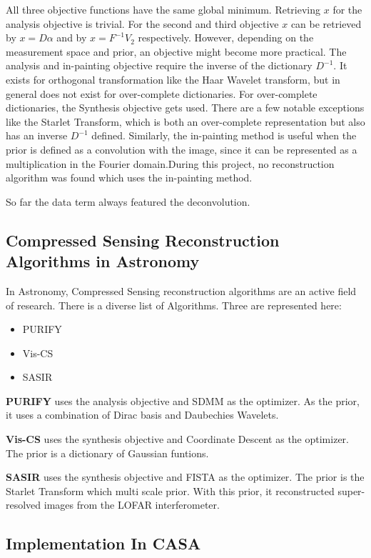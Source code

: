 All three objective functions have the same global minimum. Retrieving $x$ for the analysis objective is trivial. For the second and third objective $x$ can be retrieved by $x = D\alpha$ and by $x = F^{-1}V_2$ respectively. However, depending on the measurement space and prior, an objective might become more practical. The analysis and in-painting objective require the inverse of the dictionary $D^{-1}$. It exists for orthogonal transformation like the Haar Wavelet transform, but in general does not exist for over-complete dictionaries. For over-complete dictionaries, the Synthesis objective gets used. There are a few notable exceptions like the Starlet Transform, which is both an over-complete representation but also has an inverse $D^{-1}$ defined. Similarly, the in-painting method is useful when the prior is defined as a convolution with the image, since it can be represented as a multiplication in the Fourier domain.During this project, no reconstruction algorithm was found which uses the in-painting method.

So far the data term always featured the deconvolution. 


\subsection{Compressed Sensing Reconstruction Algorithms in Astronomy}
In Astronomy, Compressed Sensing reconstruction algorithms are an active field of research. There is a diverse list of Algorithms. Three are represented here:
\begin{itemize}
	\item PURIFY \cite{carrillo2014purify}
	\item Vis-CS \cite{felix2017compressed}
	\item SASIR \cite{girard2015sparse}
\end{itemize}

\textbf{PURIFY} uses the analysis objective and SDMM as the optimizer. As the prior, it uses a combination of Dirac basis and Daubechies Wavelets. 

\textbf{Vis-CS} uses the synthesis objective and Coordinate Descent as the optimizer. The prior is a dictionary of Gaussian funtions.  

\textbf{SASIR} uses the synthesis objective and FISTA as the optimizer. The prior is the Starlet Transform which  multi scale prior. With this prior, it reconstructed super-resolved images from the LOFAR interferometer.


\subsection{Implementation In CASA}

